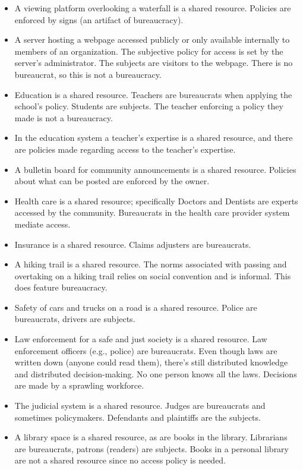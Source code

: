 {{\begin{itemize}
\item A viewing platform overlooking a waterfall is a shared resource. Policies are enforced by signs (an artifact of bureaucracy).
\item A server hosting a webpage accessed publicly or only available internally to members of an organization. The subjective policy for access is set by the server's administrator. The subjects are visitors to the webpage. There is no bureaucrat, so this is not a bureaucracy. 
\item Education is a shared resource. Teachers are bureaucrats when applying the school's policy. Students are subjects. The teacher enforcing a policy they made is not a bureaucracy.  
\item In the education system a teacher's expertise is a shared resource, and there are policies made regarding access to the teacher's expertise. 
\item A bulletin board for community announcements is a shared resource. Policies about what can be posted are enforced by the owner.
\item Health care is a shared resource; specifically Doctors and Dentists are experts accessed by the community. Bureaucrats in the health care provider system mediate access.
\item Insurance is a shared resource. Claims adjusters are bureaucrats.
\item A hiking trail is a shared resource. The norms associated with passing and overtaking on a hiking trail
relies on social convention and is informal. This does feature bureaucracy. 
\item Safety of cars and trucks on a road is a shared resource. Police are bureaucrats, drivers are subjects.
\item Law enforcement for a safe and just society is a shared resource. Law enforcement officers (e.g., police) are bureaucrats. 
Even though laws are written down (anyone could read them), there's still distributed knowledge and distributed decision-making. No one person knows all the laws. Decisions are made by a sprawling workforce.
\item The judicial system is a shared resource. Judges are bureaucrats and sometimes policymakers. Defendants and plaintiffs are the subjects. 
\item A library space is a shared resource, as are books in the library. Librarians are bureaucrats, patrons (readers) are subjects. Books in a personal library are not a shared resource since no access policy is needed.

\end{itemize}}}
